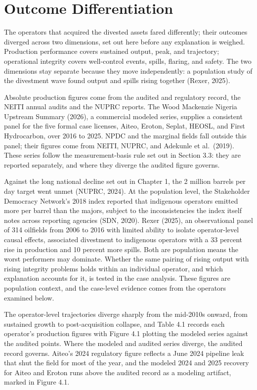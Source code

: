 \hypertarget{outcome-differentiation}{%
\section{Outcome Differentiation}\label{outcome-differentiation}}

The operators that acquired the divested assets fared differently; their
outcomes diverged across two dimensions, set out here before any
explanation is weighed. Production performance covers sustained output,
peak, and trajectory; operational integrity covers well-control events,
spills, flaring, and safety. The two dimensions stay separate because
they move independently: a population study of the divestment wave found
output and spills rising together (Rexer, 2025).

Absolute production figures come from the audited and regulatory record,
the NEITI annual audits and the NUPRC reports. The Wood Mackenzie
Nigeria Upstream Summary (2026), a commercial modeled series, supplies a
consistent panel for the five formal case licenses, Aiteo, Eroton,
Seplat, HEOSL, and First Hydrocarbon, over 2016 to 2025. NPDC and the
marginal fields fall outside this panel; their figures come from NEITI,
NUPRC, and Adekunle et al.~(2019). These series follow the
measurement-basis rule set out in Section 3.3: they are reported
separately, and where they diverge the audited figure governs.

Against the long national decline set out in Chapter 1, the 2 million
barrels per day target went unmet (NUPRC, 2024). At the population
level, the Stakeholder Democracy Network's 2018 index reported that
indigenous operators emitted more per barrel than the majors, subject to
the inconsistencies the index itself notes across reporting agencies
(SDN, 2020). Rexer (2025), an observational panel of 314 oilfields from
2006 to 2016 with limited ability to isolate operator-level causal
effects, associated divestment to indigenous operators with a 33 percent
rise in production and 10 percent more spills. Both are population means
the worst performers may dominate. Whether the same pairing of rising
output with rising integrity problems holds within an individual
operator, and which explanation accounts for it, is tested in the case
analysis. These figures are population context, and the case-level
evidence comes from the operators examined below.

The operator-level trajectories diverge sharply from the mid-2010s
onward, from sustained growth to post-acquisition collapse, and Table
4.1 records each operator's production figures with Figure 4.1 plotting
the modeled series against the audited points. Where the modeled and
audited series diverge, the audited record governs. Aiteo's 2024
regulatory figure reflects a June 2024 pipeline leak that shut the field
for most of the year, and the modeled 2024 and 2025 recovery for Aiteo
and Eroton runs above the audited record as a modeling artifact, marked
in Figure 4.1.

